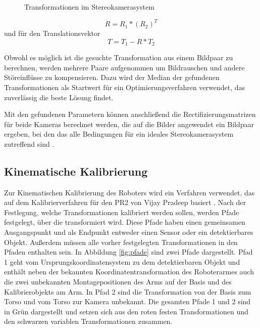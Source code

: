 \begin{figure}[htpb] \centering \def\svgwidth{\textwidth}
   \caption{Transformationen im
  Stereokamerasystem} \label{fig:StereoTrans} \end{figure}


\begin{equation} R=R_1*(R_2)^T \end{equation} und für den Translationsvektor
\begin{equation} T=T_1-R*T_2 \end{equation}

Obwohl es möglich ist die gesuchte Transformation aus einem Bildpaar zu
berechnen, werden mehrere Paare aufgenommen um Bildrauschen und andere
Störeinflüsse zu kompensieren. Dazu wird der Median der gefundenen
Transformationen als Startwert für ein Optimierungsverfahren verwendet, das
zuverlässig die beste Lösung findet.

Mit den gefundenen Parametern können anschließend die Rectifizierungsmatrizen
für beide Kameras berechnet werden, die auf die Bilder angewendet ein Bildpaar
ergeben, bei den das alle Bedingungen für ein ideales Stereokamerasystem zutreffend
sind \cite{Bradski2008}.



\subsection{Kinematische Kalibrierung} %

\label{sub:Kinematische Kalibrierung}

Zur Kinematischen Kalibrierung des Roboters wird ein Verfahren
verwendet, das auf dem Kalibrierverfahren für den PR2 von Vijay Pradeep basiert
\cite{Pradeep2010}.
Nach der Festlegung, welche Transformationen kalibriert werden sollen, werden
Pfade festgelegt, über die transformiert wird. Diese Pfade haben einen
gemeinsamen Ausgangspunkt und als Endpunkt entweder einen Sensor oder ein
detektierbares Objekt. Außerdem müssen alle vorher festgelegten
Transformationen in den Pfaden enthalten sein. In Abbildung \ref{fig:pfade}
sind zwei Pfade dargestellt. Pfad 1 geht vom Ursprungskoordinatensystem zu dem
detektierbaren Objekt und enthält neben der bekannten Koordinatentransformation
des Roboterarmes auch die zwei unbekannten Montagepositionen des Arms auf der
Basis und des Kalibrierobjekts am Arm. In Pfad 2 sind die Transformation von
der Basis zum Torso und vom Torso zur Kamera unbekannt. Die gesamten Pfade 1 und
2 sind in Grün dargestellt und setzen sich aus den roten festen Transformationen
und den schwarzen variablen Transformationen zusammen.

